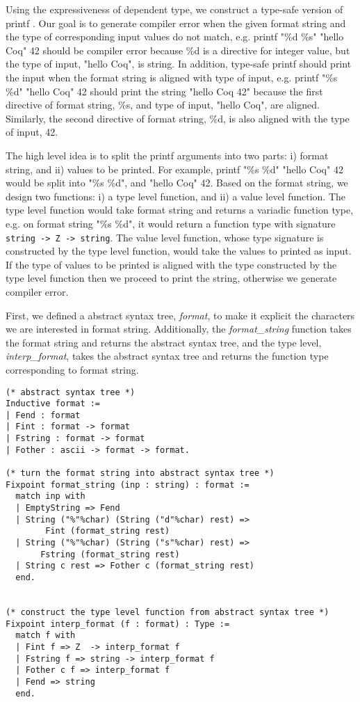 
 Using the expressiveness of dependent type, we construct a type-safe version of 
 printf \citep{Pierce:2004:ATT:1076265}. Our goal is to generate compiler error when the given format string and the type of 
 corresponding input values  
 do not match, e.g. printf "\%d \%s" "hello Coq" 42 should be compiler error because
 \%d is a directive for integer value, but the type of input, "hello Coq", is string. In addition, 
 type-safe printf should print the input when the format string is aligned with type of input, e.g.
 printf "\%s \%d" "hello Coq" 42 should print the string "hello Coq  42" because the first directive 
 of format string, \%s, and type of input, "hello Coq", are aligned. Similarly, the second directive 
 of format string, \%d, is also aligned with the type of input, 42.
 
 The high level idea is to split the printf arguments into two parts: i) format string, 
 and ii) values to be printed. For example, printf "\%s \%d" "hello Coq" 42 would be split into "\%s \%d", and 
 "hello Coq" 42.  Based on the format string, we design two functions: i) a type level function, 
 and ii) a value level function. The type level function would 
 take format string and returns a variadic function type, e.g. 
 on format string "\%s \%d", it would return a function type with 
 signature \texttt{string -> Z  -> string}.
 The value level function, whose type signature 
 is constructed by the type level function, would take the values to printed as input. If the 
 type of values to be printed is aligned with the type constructed by the type level function then 
 we proceed to print the string, otherwise we generate compiler error.  
 


First, we defined a abstract syntax tree, \textit{format}, to make it explicit the characters we 
are interested in format string. Additionally, the \textit{format\_string} function takes the format string 
and returns the abstract syntax tree, and the type level, \textit{interp\_format}, takes the 
abstract syntax tree and returns the function type corresponding to format string.

\begin{verbatim}
(* abstract syntax tree *)
Inductive format :=
| Fend : format
| Fint : format -> format
| Fstring : format -> format
| Fother : ascii -> format -> format.

(* turn the format string into abstract syntax tree *)
Fixpoint format_string (inp : string) : format :=
  match inp with
  | EmptyString => Fend
  | String ("%"%char) (String ("d"%char) rest) => 
        Fint (format_string rest)
  | String ("%"%char) (String ("s"%char) rest) => 
       Fstring (format_string rest)
  | String c rest => Fother c (format_string rest)
  end.


(* construct the type level function from abstract syntax tree *)
Fixpoint interp_format (f : format) : Type :=
  match f with
  | Fint f => Z  -> interp_format f
  | Fstring f => string -> interp_format f
  | Fother c f => interp_format f
  | Fend => string
  end.
\end{verbatim}


